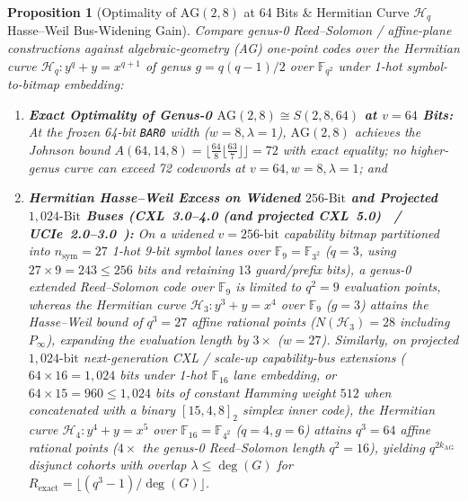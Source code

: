 \documentclass[10pt,twocolumn]{article}
\theoremstyle{spectralthm}
\newtheorem{proposition}[theorem]{Proposition}
\begin{document}
\begin{proposition}[Optimality of $\mathrm{AG}(2,8)$ at 64 Bits \& Hermitian Curve $\mathcal{H}_q$ Hasse--Weil Bus-Widening Gain]
\label{prop:hermitian_ag}
Compare genus-0 Reed--Solomon / affine-plane constructions against algebraic-geometry (AG) one-point codes over the Hermitian curve $\mathcal{H}_q : y^q + y = x^{q+1}$ of genus $g = q(q-1)/2$ over $\mathbb{F}_{q^2}$ under 1-hot symbol-to-bitmap embedding:
\begin{enumerate}
  \item[(i)] \textbf{Exact Optimality of Genus-0 $\mathrm{AG}(2,8) \cong S(2,8,64)$ at $v = 64$ Bits:} At the frozen 64-bit \texttt{BAR0} width ($w = 8, \lambda = 1$), $\mathrm{AG}(2,8)$ achieves the Johnson bound $A(64,14,8) = \lfloor \frac{64}{8}\lfloor \frac{63}{7}\rfloor \rfloor = 72$ with exact equality; no higher-genus curve can exceed 72 codewords at $v=64, w=8, \lambda=1$; and
  \item[(ii)] \textbf{Hermitian Hasse--Weil Excess on Widened $256\text{-Bit}$ and Projected $1,024\text{-Bit}$ Buses (\mbox{CXL~3.0--4.0} (and projected \mbox{CXL~5.0})~\cite{cxl2025spec} / \mbox{UCIe~2.0--3.0}~\cite{ucie2025spec30}):} On a widened $v = 256\text{-bit}$ capability bitmap partitioned into $n_{\mathrm{sym}} = 27$ 1-hot 9-bit symbol lanes over $\mathbb{F}_9 = \mathbb{F}_{3^2}$ ($q = 3$, using $27 \times 9 = 243 \le 256$ bits and retaining $13$ guard/prefix bits), a genus-0 extended Reed--Solomon code over $\mathbb{F}_9$ is limited to $q^2 = 9$ evaluation points, whereas the Hermitian curve $\mathcal{H}_3 : y^3 + y = x^4$ over $\mathbb{F}_9$ ($g = 3$) attains the Hasse--Weil bound of $q^3 = 27$ affine rational points ($N(\mathcal{H}_3) = 28$ including $P_\infty$), expanding the evaluation length by $3\times$ ($w = 27$). Similarly, on projected $1,024\text{-bit}$ next-generation CXL / scale-up capability-bus extensions ($64 \times 16 = 1,024$ bits under 1-hot $\mathbb{F}_{16}$ lane embedding, or $64 \times 15 = 960 \le 1,024$ bits of constant Hamming weight $512$ when concatenated with a binary $[15,4,8]_2$ simplex inner code), the Hermitian curve $\mathcal{H}_4 : y^4 + y = x^5$ over $\mathbb{F}_{16} = \mathbb{F}_{4^2}$ ($q = 4, g = 6$) attains $q^3 = 64$ affine rational points ($4\times$ the genus-0 Reed--Solomon length $q^2 = 16$), yielding $q^{2 k_{\mathrm{AG}}}$ disjunct cohorts with overlap $\lambda \le \deg(G)$ for $R_{\mathrm{exact}} = \lfloor (q^3 - 1)/\deg(G) \rfloor$.
\end{enumerate}
\end{proposition}
\end{document}
